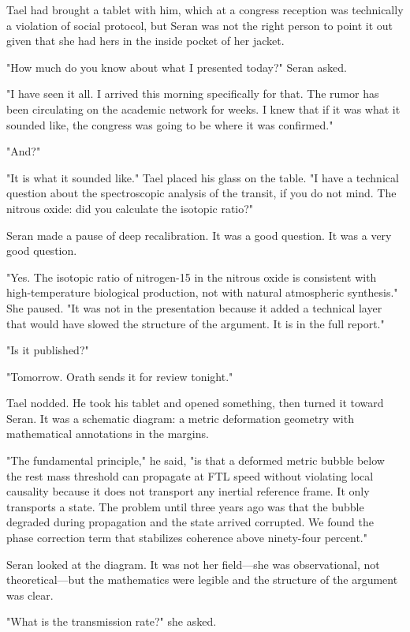 \documentclass[11pt,a5paper,twoside]{book}
\begin{document}
Tael had brought a tablet with him, which at a congress reception was technically a violation of social protocol, but Seran was not the right person to point it out given that she had hers in the inside pocket of her jacket.

"How much do you know about what I presented today?" Seran asked.

"I have seen it all. I arrived this morning specifically for that. The rumor has been circulating on the academic network for weeks. I knew that if it was what it sounded like, the congress was going to be where it was confirmed."

"And?"

"It is what it sounded like." Tael placed his glass on the table. "I have a technical question about the spectroscopic analysis of the transit, if you do not mind. The nitrous oxide: did you calculate the isotopic ratio?"

Seran made a pause of deep recalibration. It was a good question. It was a very good question.

"Yes. The isotopic ratio of nitrogen-15 in the nitrous oxide is consistent with high-temperature biological production, not with natural atmospheric synthesis." She paused. "It was not in the presentation because it added a technical layer that would have slowed the structure of the argument. It is in the full report."

"Is it published?"

"Tomorrow. Orath sends it for review tonight."

Tael nodded. He took his tablet and opened something, then turned it toward Seran. It was a schematic diagram: a metric deformation geometry with mathematical annotations in the margins.

"The fundamental principle," he said, "is that a deformed metric bubble below the rest mass threshold can propagate at FTL speed without violating local causality because it does not transport any inertial reference frame. It only transports a state. The problem until three years ago was that the bubble degraded during propagation and the state arrived corrupted. We found the phase correction term that stabilizes coherence above ninety-four percent."

Seran looked at the diagram. It was not her field—she was observational, not theoretical—but the mathematics were legible and the structure of the argument was clear.

"What is the transmission rate?" she asked.
\end{document}
